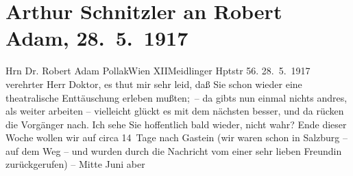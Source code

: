 

         
         \renewcommand{\erwaehntePersonen}{Personen: Robert Adam, Stefanie Bachrach, Alexandre père Dumas}
         \renewcommand{\erwaehnteOrte}{Orte: Bad Gastein, Meidlinger Hauptstraße, Salzburg, Wien, XII., Meidling}
         \renewcommand{\erwaehnteWerke}{Werke: Meine Memoiren}
               \section[Arthur Schnitzler an Robert Adam, 28. 5. 1917]{ Arthur Schnitzler an Robert Adam, 28. 5. 1917}\nopagebreak{}\rehead{ }\begin{ledgroupsized}[t]{13cm}\normalsize\beginnumbering{} \toendnotes[C]{\smallbreak\pagebreak[2]} 
\toendnotes[C]{\smallbreak}\pstart{}{\pb}Hrn Dr. Robert Adam Pollak\pend{}\pstart{}Wien XII\pend{}\pstart{}Meidlinger Hptstr 56.\pend{}{\bigskip}\pstart
           \raggedleft{}{\pb}28. 5. 1917\pend
           \pstart{}verehrter Herr Doktor,\pend\pstart
           es thut mir sehr leid, daß Sie schon wieder eine theatralische Enttäuschung erleben
               mußten; – da gibts nun einmal nichts andres, als weiter arbeiten – vielleicht glückt
               es mit dem nächsten besser, und da{\geminationn} rücken die Vorgänger
               nach.\pend
           \pstart
           Ich sehe Sie hoffentlich bald wieder, nicht wahr? Ende dieser Woche wollen wir auf
               circa 14 Tage nach Gastein (wir waren schon in
                  Salzburg – auf dem Weg – und wurden durch die
               Nachricht vom \label{K_L02261-1v}\label{K_L02261-1h} einer sehr lieben Freundin zurückgerufen) – Mitte Juni aber

\end{ledgroupsized}
